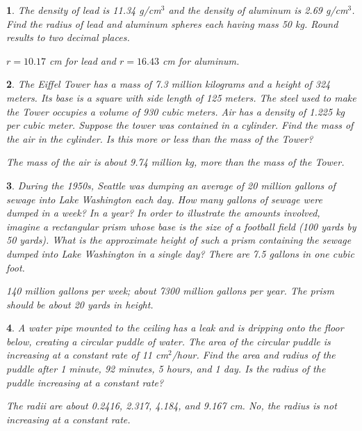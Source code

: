 \documentclass{amsbook}
\newtheorem{exc}{}
\newenvironment{ex}{\begin{exc}\normalfont}{\end{exc}}
\numberwithin{section}{chapter}
\numberwithin{equation}{chapter}
\begin{document}
\begin{ex} %
	The density of lead is 11.34 g/cm$^3$ and the density of aluminum is 2.69 g/cm$^3$. Find the radius of lead and aluminum spheres each having mass 50 kg. Round results to two decimal places.
	\begin{sol}
		$r=10.17$ cm for lead and $r=16.43$ cm for aluminum.
	\end{sol}
\end{ex}

\begin{ex} %
	The Eiffel Tower has a mass of 7.3 million kilograms and a height of 324 meters. Its base is a square with side length of 125 meters. The steel used to make the Tower occupies a volume of 930 cubic meters. Air has a density of 1.225 kg per cubic meter. Suppose the tower was contained in a cylinder. Find the mass of the air in the cylinder. Is this more or less than the mass of the Tower?
	\begin{sol}
		The mass of the air is about 9.74 million kg, more than the mass of the Tower.
	\end{sol}
\end{ex}

\begin{ex} %
	During the 1950s, Seattle was dumping an average of 20 million gallons of sewage into Lake Washington each day. How many gallons of sewage were dumped in a week? In a year? In order to illustrate the amounts involved, imagine a rectangular prism whose base is the size of a football field (100 yards by 50 yards). What is the approximate height of such a prism containing the sewage dumped into Lake Washington in a single day? There are 7.5 gallons in one cubic foot.
	\begin{sol}
		140 million gallons per week; about 7300 million gallons per year. The prism should be about 20 yards in height.
	\end{sol}
\end{ex}

\begin{ex} %
	A water pipe mounted to the ceiling has a leak and is dripping onto the floor below, creating a circular puddle of water. The area of the circular puddle is increasing at a constant rate of 11 cm$^2$/hour. Find the area and radius of the puddle after 1 minute, 92 minutes, 5 hours, and 1 day. Is the radius of the puddle increasing at a constant rate?
	\begin{sol}
		The radii are about 0.2416, 2.317, 4.184, and 9.167 cm. No, the radius is not increasing at a constant rate.
		\end{sol}
\end{ex}
\end{document}

